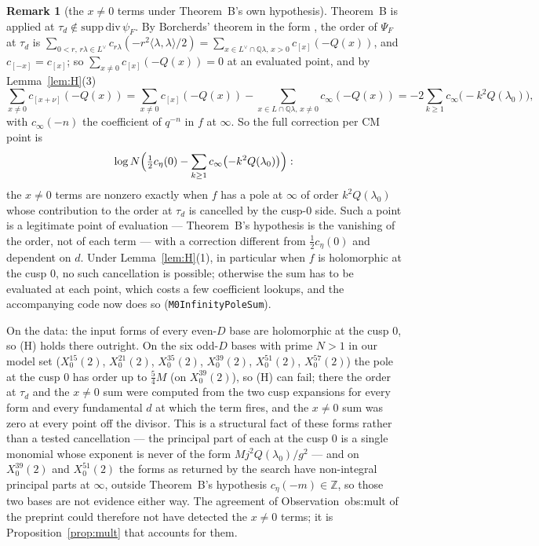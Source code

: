 \documentclass[11pt,reqno]{amsart}
\theoremstyle{plain}
\theoremstyle{definition}
\newtheorem{remark}[theorem]{Remark}
\newcommand{\Q}{\mathbb{Q}}
\newcommand{\Z}{\mathbb{Z}}
\newcommand{\Ldual}{L^{\vee}}
\begin{document}
\begin{remark}[the $x\neq0$ terms under Theorem~B's own hypothesis]\label{rem:xsum}
Theorem~B is applied at $\tau_d\notin\mathrm{supp}\,\mathrm{div}\,\psi_F$. By Borcherds' theorem
in the form \cite[Thm.~A(2)]{Yang}, the order of $\Psi_F$ at $\tau_d$ is $\sum_{0<r,\,r\lambda\in
\Ldual}c_{r\lambda}(-r^2\langle\lambda,\lambda\rangle/2)=\sum_{x\in\Ldual\cap\Q\lambda,\,x>0}
c_{[x]}(-Q(x))$, and $c_{[-x]}=c_{[x]}$; so $\sum_{x\neq0}c_{[x]}(-Q(x))=0$ at an evaluated point,
and by Lemma~\ref{lem:H}(3)
\[
  \sum_{x\neq0}c_{[x+\nu]}(-Q(x))
   =\sum_{x\neq0}c_{[x]}(-Q(x))-\sum_{x\in L\cap\Q\lambda,\,x\neq0}c_\infty(-Q(x))
   =-2\sum_{k\ge1}c_\infty\bigl(-k^2Q(\lambda_0)\bigr),
\]
with $c_\infty(-n)$ the coefficient of $q^{-n}$ in $f$ at $\infty$. So the full correction per CM
point is
\[
  \log N\Bigl(\tfrac12c_\eta(0)-\sum_{k\ge1}c_\infty\bigl(-k^2Q(\lambda_0)\bigr)\Bigr):
\]
the $x\neq0$ terms are nonzero exactly when $f$ has a pole at $\infty$ of order $k^2Q(\lambda_0)$
whose contribution to the order at $\tau_d$ is cancelled by the cusp-$0$ side. Such a point is a
legitimate point of evaluation --- Theorem~B's hypothesis is the vanishing of the order, not of
each term --- with a correction different from $\tfrac12c_\eta(0)$ and dependent on $d$. Under
Lemma~\ref{lem:H}(1), in particular when $f$ is holomorphic at the cusp $0$, no such cancellation
is possible; otherwise the sum has to be evaluated at each point, which costs a few coefficient
lookups, and the accompanying code now does so (\texttt{M0InfinityPoleSum}).

On the data: the input forms of every even-$D$ base are holomorphic at the cusp $0$, so (H) holds
there outright. On the six odd-$D$ bases with prime $N>1$ in our model set
($X_0^{15}(2)$, $X_0^{21}(2)$, $X_0^{35}(2)$, $X_0^{39}(2)$, $X_0^{51}(2)$, $X_0^{57}(2)$) the
pole at the cusp $0$ has order up to $\tfrac54M$ (on $X_0^{39}(2)$), so (H) can fail; there the
order at $\tau_d$ and the $x\neq0$ sum were computed from the two cusp expansions for every form
and every fundamental $d$ at which the term fires, and the $x\neq0$ sum was zero at every point
off the divisor. This is a structural fact of these forms rather than a tested cancellation --- the
principal part of each at the cusp $0$ is a single monomial whose exponent is never of the form
$Mj^2Q(\lambda_0)/g^2$ --- and on $X_0^{39}(2)$ and $X_0^{51}(2)$ the forms as returned by the
search have non-integral principal parts at $\infty$, outside Theorem~B's hypothesis
$c_\eta(-m)\in\Z$, so those two bases are not evidence either way. The agreement of
\textup{Observation~obs:mult of the preprint} could therefore not have detected the $x\neq0$ terms; it is
Proposition~\ref{prop:mult} that accounts for them.
\end{remark}
\end{document}
